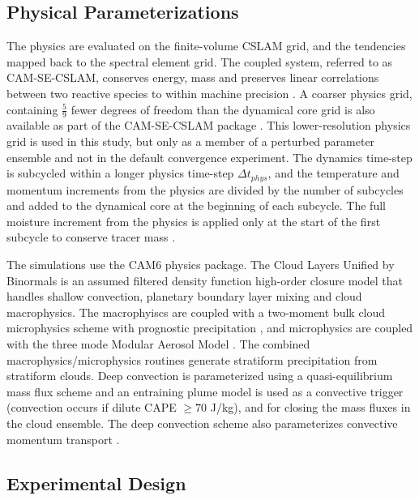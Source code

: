 \documentclass[times]{qjrms4}
\begin{document}
\subsection{Physical Parameterizations}

The physics are evaluated on the finite-volume CSLAM grid, and the tendencies mapped back to the spectral element grid. The coupled system, referred to as CAM-SE-CSLAM, conserves energy, mass and preserves linear correlations between two reactive species to within machine precision \citep{HL2018MWR}. A coarser physics grid, containing $\frac{5}{9}$ fewer degrees of freedom than the dynamical core grid is also available as part of the CAM-SE-CSLAM package \citep{HETAL2019JAMES}. This lower-resolution physics grid is used in this study, but only as a member of a perturbed parameter ensemble and not in the default convergence experiment. The dynamics time-step is subcycled within a longer physics time-step $\Delta t_{phys}$, and the temperature and momentum increments from the physics are divided by the number of subcycles and added to the dynamical core at the beginning of each subcycle. The full moisture increment from the physics is applied only at the start of the first subcycle to conserve tracer mass \citep[$ftype=2$ option in][]{LW2019JAMES}.

The simulations use the CAM6 physics package. The Cloud Layers Unified by Binormals \citep[CLUBB][]{GETAL2002JAS,BOG2013JCLIM} is an assumed filtered density function \citep{G1992JFM} high-order closure model that handles shallow convection, planetary boundary layer mixing and cloud macrophysics. The macrophyiscs are coupled with a two-moment bulk cloud microphysics scheme with prognostic precipitation \citep{MG2}, and microphysics are coupled with the three mode Modular Aerosol Model \citep{MAM}. The combined macrophysics/microphysics routines generate stratiform precipitation from stratiform clouds. Deep convection is parameterized using a quasi-equilibrium mass flux scheme \citep{ZM1995AO} and an entraining plume model \citep[referred to as the dilute convective available potential energy, or {\em{dilute CAPE}} hereafter;][]{RB1992JAS, NRJ2008JC} is used as a convective trigger (convection occurs if dilute CAPE $\geq 70$ J/kg), and for closing the mass fluxes in the cloud ensemble. The deep convection scheme also parameterizes convective momentum transport \citep{RR2008JC}.

\subsection{Experimental Design}
\end{document}
